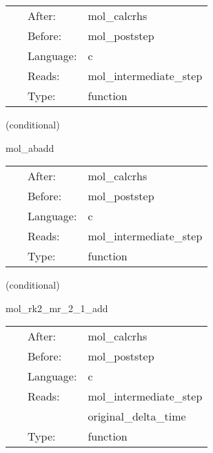 \hspace{5mm}

 \begin{tabular*}{160mm}{cll} 
~ & After:  & mol\_calcrhs \\ 
~ & Before:  & mol\_poststep \\ 
~ & Language:  & c \\ 
~ & Reads:  & mol\_intermediate\_step \\ 
~ & Type:  & function \\ 
\end{tabular*} 


\vspace{5mm}

   (conditional) 

\hspace{5mm} mol\_abadd 

\hspace{5mm}{\it updates calculated with the adams-bashforth } 


\hspace{5mm}

 \begin{tabular*}{160mm}{cll} 
~ & After:  & mol\_calcrhs \\ 
~ & Before:  & mol\_poststep \\ 
~ & Language:  & c \\ 
~ & Reads:  & mol\_intermediate\_step \\ 
~ & Type:  & function \\ 
\end{tabular*} 


\vspace{5mm}

   (conditional) 

\hspace{5mm} mol\_rk2\_mr\_2\_1\_add 

\hspace{5mm}{\it updates calculated with the multirate runge-kutta 2 method } 


\hspace{5mm}

 \begin{tabular*}{160mm}{cll} 
~ & After:  & mol\_calcrhs \\ 
~ & Before:  & mol\_poststep \\ 
~ & Language:  & c \\ 
~ & Reads:  & mol\_intermediate\_step \\ 
~& ~ &original\_delta\_time\\ 
~ & Type:  & function \\ 
\end{tabular*} 


